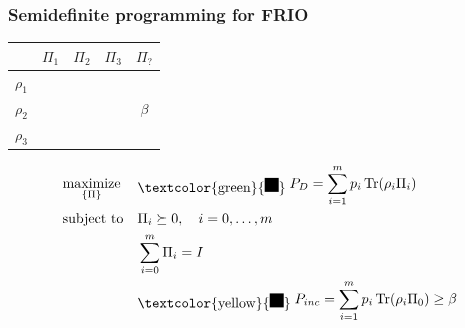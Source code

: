 \documentclass{beamer}
\begin{document}
\begin{frame}
    \frametitle{Semidefinite programming for FRIO}
    \begin{table}[ht]
        \begin{tabular}{c | c c c c}
                       & $\Pi_{1}$            & $\Pi_{2}$            & $\Pi_{3}$            & $\Pi_{?}$                      \\
            \hline
            $\rho_{1}$ & \cellcolor{green!20} & \cellcolor{red!20}   & \cellcolor{red!20}   & \cellcolor{yellow!30}          \\
            $\rho_{2}$ & \cellcolor{red!20}   & \cellcolor{green!20} & \cellcolor{red!20}   & \cellcolor{yellow!30}  $\beta$ \\
            $\rho_{3}$ & \cellcolor{red!20}   & \cellcolor{red!20}   & \cellcolor{green!20} & \cellcolor{yellow!30}          \\
        \end{tabular}
    \end{table}
    \begin{align}
         & \underset{\{\Pi\}}{\text{maximize}} &  & \raisebox{-0.3em}{\textcolor{green}{\rule{1em}{1em}}} \; P_{D}=\sum_{i=1}^{m} p_{i} \operatorname{Tr}(\rho_{i} \Pi_{i})               \\
         & \text{subject to}                   &  & \Pi_{i} \succeq 0, \quad i = 0, \ldots, m                                                                                             \\
         &                                     &  & \sum_{i=0}^{m} \Pi_i = I                                                                                                              \\
         &                                     &  & \raisebox{-0.3em}{\textcolor{yellow}{\rule{1em}{1em}}} \; P_{inc}=\sum_{i=1}^{m} p_{i} \operatorname{Tr}(\rho_{i} \Pi_{0}) \geq \beta
    \end{align}
\end{frame}
\end{document}
